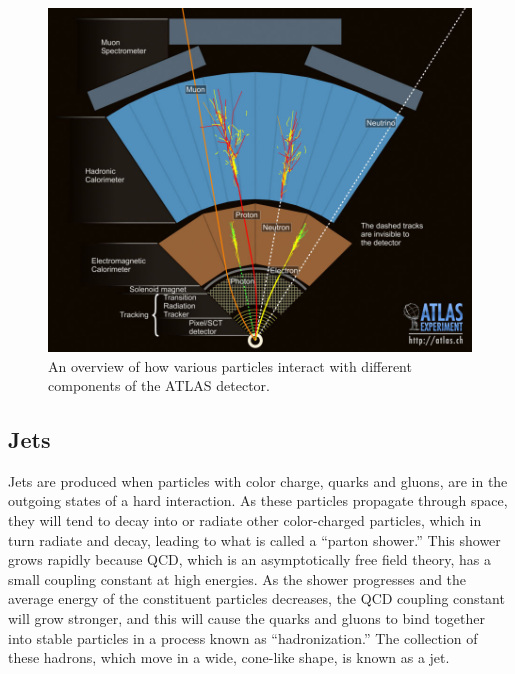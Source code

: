 \begin{figure}
  \begin{center}
    \includegraphics[width=125mm]{figures/atlas/ParticleInteractionOverview.jpg}
  \end{center}
  \caption{An overview of how various particles interact with different components of the ATLAS detector.}
  \label{img:ParticleInteractionOverview}
\end{figure}


\subsection{Jets}
Jets are produced when particles with color charge, quarks and gluons, are in the outgoing states of a hard interaction.
As these particles propagate through space, they will tend to decay into or radiate other color-charged particles, which in turn radiate and decay, leading to what is called a ``parton shower.''
This shower grows rapidly because QCD, which is an asymptotically free field theory, has a small coupling constant at high energies.  
As the shower progresses and the average energy of the constituent particles decreases, the QCD coupling constant will grow stronger, and this will cause the quarks and gluons to bind together into stable particles in a process known as ``hadronization.''
The collection of these hadrons, which move in a wide, cone-like shape, is known as a jet.

